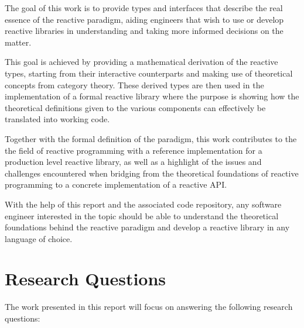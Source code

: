The goal of this work is to provide types and interfaces that describe the real essence of the reactive paradigm, aiding engineers that wish to use or develop reactive libraries in understanding and taking more informed decisions on the matter.

This goal is achieved by providing a mathematical derivation of the reactive types, starting from their interactive counterparts and making use of theoretical concepts from category theory. These derived types are then used in the implementation of a formal reactive library where the purpose is showing how the theoretical definitions given to the various components can effectively be translated into working code. 

Together with the formal definition of the paradigm, this work contributes to the the field of reactive programming with a reference implementation for a production level reactive library, as well as a highlight of the issues and challenges encountered when bridging from the theoretical foundations of reactive programming to a concrete implementation of a reactive API. 

With the help of this report and the associated code repository, any software engineer interested in the topic should be able to understand the theoretical foundations behind the reactive paradigm and develop a reactive library in any language of choice.

\section*{Research Questions}

The work presented in this report will focus on answering the following research questions:

